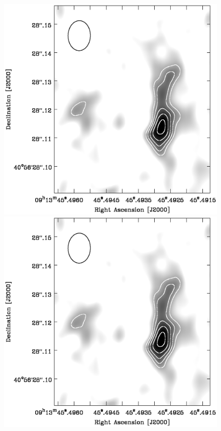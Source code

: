 \begin{figure}
  \begin{center}
    \begin{minipage}{0.495\linewidth}
      \includegraphics[width=\textwidth, trim=51mm 6mm 15mm 12mm, clip]{iras09_1.4zoom.eps}
    \end{minipage}
    \begin{minipage}{0.495\linewidth}
      \includegraphics[width=\textwidth, trim=51mm 6mm 15mm 12mm, clip]{iras09_4.8zoom.eps}

\end{minipage}
\end{center}
\end{figure}
